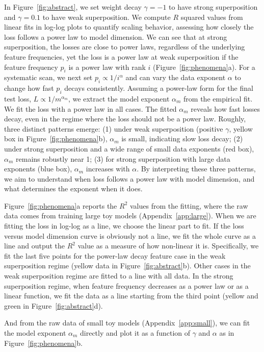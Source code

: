 \documentclass{article}
\begin{document}
In Figure~\ref{fig:abstract}, we set weight decay $\gamma = -1$ to have strong superposition and $\gamma = 0.1$ to have weak superposition. We compute $R$ squared values from linear fits in log-log plots to quantify scaling behavior, assessing how closely the loss follows a power law to model dimension. We can see that at strong superposition, the losses are close to power laws, regardless of the underlying feature frequencies, yet the loss is a power law at weak superposition if the feature frequency $p_i$ is a power law with rank $i$ (Figure~\ref{fig:phenomena}a). For a systematic scan, we next set $p_i \propto 1/i^\alpha $ and can vary the data exponent $\alpha$ to change how fast $p_i$ decays consistently. Assuming a power-law form for the final test loss, $L \propto 1 / m^{\alpha_m}$, we extract the model exponent $\alpha_m$ from the empirical fit. We fit the loss with a power law in all cases. The fitted $\alpha_m$ reveals how fast losses decay, even in the regime where the loss should not be a power law. Roughly, three distinct patterns emerge: (1) under weak superposition (positive $\gamma$, yellow box in Figure~\ref{fig:phenomena}b), $\alpha_m$ is small, indicating slow loss decay; (2) under strong superposition and a wide range of small data exponents (red box), $\alpha_m$ remains robustly near 1; (3) for strong superposition with large data exponents (blue box), $\alpha_m$ increases with $\alpha$. By interpreting these three patterns, we aim to understand when loss follows a power law with model dimension, and what determines the exponent when it does.

Figure~\ref{fig:phenomena}a reports the $R^2$ values from the fitting, where the raw data comes from training large toy models (Appendix~\ref{app:large}). When we are fitting the loss in log-log as a line, we choose the linear part to fit. If the loss versus model dimension curve is obviously not a line, we fit the whole curve as a line and output the $R^2$ value as a measure of how non-linear it is. Specifically, we fit the last five points for the power-law decay feature case in the weak superposition regime (yellow data in Figure~\ref{fig:abstract}b). Other cases in the weak superposition regime are fitted to a line with all data. In the strong superposition regime, when feature frequency decreases as a power law or as a linear function, we fit the data as a line starting from the third point (yellow and green in Figure~\ref{fig:abstract}d).

And from the raw data of small toy models (Appendix~\ref{app:small}), we can fit the model exponent $\alpha_m$ directly and plot it as a function of $\gamma$ and $\alpha$ as in Figure~\ref{fig:phenomena}b. 
\end{document}
